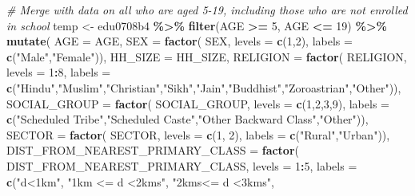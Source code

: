 \documentclass[
]{article}
\newenvironment{Shaded}{\begin{snugshade}}{\end{snugshade}}
\newcommand{\AttributeTok}[1]{\textcolor[rgb]{0.13,0.29,0.53}{#1}}
\newcommand{\CommentTok}[1]{\textcolor[rgb]{0.56,0.35,0.01}{\textit{#1}}}
\newcommand{\DecValTok}[1]{\textcolor[rgb]{0.00,0.00,0.81}{#1}}
\newcommand{\FunctionTok}[1]{\textcolor[rgb]{0.13,0.29,0.53}{\textbf{#1}}}
\newcommand{\NormalTok}[1]{#1}
\newcommand{\OtherTok}[1]{\textcolor[rgb]{0.56,0.35,0.01}{#1}}
\newcommand{\SpecialCharTok}[1]{\textcolor[rgb]{0.81,0.36,0.00}{\textbf{#1}}}
\newcommand{\StringTok}[1]{\textcolor[rgb]{0.31,0.60,0.02}{#1}}
\begin{document}
\begin{Shaded}
\begin{Highlighting}[]
\CommentTok{\# Merge with data on all who are aged 5{-}19, including those who are not enrolled in school}
\NormalTok{temp }\OtherTok{\textless{}{-}}\NormalTok{ edu0708b4 }\SpecialCharTok{\%\textgreater{}\%}
  \FunctionTok{filter}\NormalTok{(AGE }\SpecialCharTok{\textgreater{}=} \DecValTok{5}\NormalTok{, AGE }\SpecialCharTok{\textless{}=} \DecValTok{19}\NormalTok{) }\SpecialCharTok{\%\textgreater{}\%}
  \FunctionTok{mutate}\NormalTok{(}
    \AttributeTok{AGE =}\NormalTok{ AGE,}
    \AttributeTok{SEX =} \FunctionTok{factor}\NormalTok{(}
\NormalTok{      SEX,}
      \AttributeTok{levels =} \FunctionTok{c}\NormalTok{(}\DecValTok{1}\NormalTok{,}\DecValTok{2}\NormalTok{),}
      \AttributeTok{labels =} \FunctionTok{c}\NormalTok{(}\StringTok{"Male"}\NormalTok{,}\StringTok{"Female"}\NormalTok{)),}
    \AttributeTok{HH\_SIZE =}\NormalTok{ HH\_SIZE,}
    \AttributeTok{RELIGION =} \FunctionTok{factor}\NormalTok{(}
\NormalTok{      RELIGION, }
      \AttributeTok{levels =} \DecValTok{1}\SpecialCharTok{:}\DecValTok{8}\NormalTok{, }
      \AttributeTok{labels =} \FunctionTok{c}\NormalTok{(}\StringTok{"Hindu"}\NormalTok{,}\StringTok{"Muslim"}\NormalTok{,}\StringTok{"Christian"}\NormalTok{,}\StringTok{"Sikh"}\NormalTok{,}\StringTok{"Jain"}\NormalTok{,}\StringTok{"Buddhist"}\NormalTok{,}\StringTok{"Zoroastrian"}\NormalTok{,}\StringTok{"Other"}\NormalTok{)),}
    \AttributeTok{SOCIAL\_GROUP =} \FunctionTok{factor}\NormalTok{(}
\NormalTok{      SOCIAL\_GROUP, }
      \AttributeTok{levels =} \FunctionTok{c}\NormalTok{(}\DecValTok{1}\NormalTok{,}\DecValTok{2}\NormalTok{,}\DecValTok{3}\NormalTok{,}\DecValTok{9}\NormalTok{), }
      \AttributeTok{labels =} \FunctionTok{c}\NormalTok{(}\StringTok{"Scheduled Tribe"}\NormalTok{,}\StringTok{"Scheduled Caste"}\NormalTok{,}\StringTok{"Other Backward Class"}\NormalTok{,}\StringTok{"Other"}\NormalTok{)),}
    \AttributeTok{SECTOR =} \FunctionTok{factor}\NormalTok{(}
\NormalTok{      SECTOR,}
      \AttributeTok{levels =} \FunctionTok{c}\NormalTok{(}\DecValTok{1}\NormalTok{, }\DecValTok{2}\NormalTok{),}
      \AttributeTok{labels =} \FunctionTok{c}\NormalTok{(}\StringTok{"Rural"}\NormalTok{,}\StringTok{"Urban"}\NormalTok{)),}
    \AttributeTok{DIST\_FROM\_NEAREST\_PRIMARY\_CLASS =} \FunctionTok{factor}\NormalTok{(}
\NormalTok{      DIST\_FROM\_NEAREST\_PRIMARY\_CLASS,}
      \AttributeTok{levels =} \DecValTok{1}\SpecialCharTok{:}\DecValTok{5}\NormalTok{,}
      \AttributeTok{labels =} \FunctionTok{c}\NormalTok{(}\StringTok{"d\textless{}1km"}\NormalTok{,}
                 \StringTok{"1km \textless{}= d \textless{}2kms"}\NormalTok{,}
                 \StringTok{"2kms\textless{}= d \textless{}3kms"}\NormalTok{,}

\end{Highlighting}
\end{Shaded}
\end{document}
